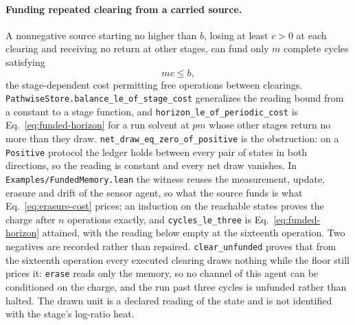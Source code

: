 \documentclass{article}
\begin{document}
\paragraph{Funding repeated clearing from a carried source.}
A nonnegative source starting no higher than $b$, losing at least $c>0$ at each clearing and receiving no return at other stages, can fund only $m$ complete cycles satisfying
\begin{equation}
 mc\leq b ,
 \label{eq:funded-horizon}
\end{equation}
the stage-dependent cost permitting free operations between clearings.
\nolinkurl{PathwiseStore.balance_le_of_stage_cost}
generalizes the reading bound from a constant to a stage function, and
\nolinkurl{horizon_le_of_periodic_cost}
is Eq.~\eqref{eq:funded-horizon} for a run solvent at $pm$ whose other stages
return no more than they draw. \nolinkurl{net_draw_eq_zero_of_positive} is the obstruction:
on a \texttt{Positive} protocol the ledger holds between every pair of states in
both directions, so the reading is constant and every net draw vanishes. In
\nolinkurl{Examples/FundedMemory.lean} the witness reuses
the measurement, update, erasure and drift of the sensor agent, so what the
source funds is what Eq.~\eqref{eq:erasure-cost} prices; an induction on the
reachable states proves the charge after $n$ operations exactly, and
\nolinkurl{cycles_le_three} is
Eq.~\eqref{eq:funded-horizon} attained, with the reading below empty at the
sixteenth operation. Two negatives are recorded rather than repaired.
\nolinkurl{clear_unfunded} proves that from the sixteenth operation
every executed clearing draws nothing while the floor still prices it:
\texttt{erase} reads only the memory, so no channel of this agent can be
conditioned on the charge, and the run past three cycles is unfunded rather than
halted. The drawn unit is a declared reading of the state and is not identified
with the stage's log-ratio heat.
\end{document}
